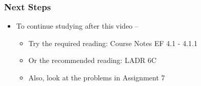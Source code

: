\documentclass[10pt,english,aspectratio=169]{beamer}
\begin{document}
\begin{frame} \frametitle{Next Steps}

\begin{itemize}
\setlength\itemsep{5mm}
\item To continue studying after this video -- \vspace{2mm}

\begin{itemize}
 \setlength\itemsep{3mm}
 \item Try the required reading: Course Notes EF 4.1 - 4.1.1
 \item Or the recommended reading: LADR 6C
 \item Also, look at the problems in Assignment 7
\end{itemize}
\end{itemize}


\end{frame}
\end{document}
